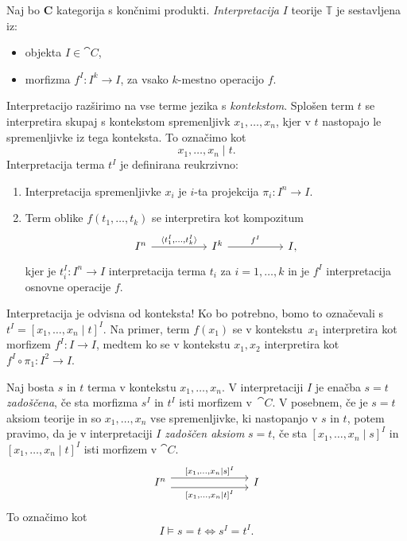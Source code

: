 \documentclass[../kategoricna_logika.tex]{subfiles}
\begin{document}
\begin{definicija}
  Naj bo $\mathbf{C}$ kategorija s končnimi
  produkti. \emph{Interpretacija} $I$ teorije $\mathbb{T}$ je
  sestavljena iz:
  \begin{itemize}
  \item objekta $I \in \cat{C}$,
  \item morfizma $f^I : I^k \to I$, za vsako $k$-mestno operacijo $f$.
  \end{itemize}
%
  Interpretacijo razširimo na vse terme jezika s \emph{kontekstom}.
  Splošen term $t$ se interpretira skupaj s
  kontekstom spremenljivk $x_1, \ldots, x_n$, kjer v $t$ nastopajo le
  spremenljivke iz tega konteksta. To označimo kot
$$x_1, \ldots, x_n \mid t.$$
%
Interpretacija terma $t^I$ je definirana reukrzivno:
  \begin{enumerate}
  \item Interpretacija spremenljivke $x_i$ je $i$-ta projekcija
    $\pi_i : I^n \to I.$
%
  \item Term oblike $f(t_1, \ldots, t_k)$ se interpretira kot
    kompozitum
    \begin{equation*}
      \begin{tikzcd}[column sep = 5em]
        I^n \ar[r, "{\langle t_1^I, \ldots, t_k^I\rangle}"] & I^k \ar[r, "f^I"] & I,
      \end{tikzcd}
    \end{equation*}
    kjer je $t_i^I : I^n \to I$ interpretacija terma $t_i$ za
    $i = 1, \ldots, k$ in je $f^I$ interpretacija osnovne operacije
    $f$.
  \end{enumerate}
\end{definicija}
%
\begin{opomba}
Interpretacija je odvisna od konteksta! Ko bo potrebno, bomo to označevali s
$t^I = [x_1, \ldots, x_n \mid t]^I$. Na primer, 
  term $f(x_1)$ se v kontekstu~$x_1$ interpretira kot morfizem
  $f^I : I \to I$, medtem ko se v kontekstu $x_1, x_2$ interpretira
  kot $f^I \circ \pi_1 : I^2 \to I$.
\end{opomba}
%
\begin{definicija}
  Naj bosta $s$ in $t$ terma v kontekstu $x_1, \ldots, x_n$.  V
  interpretaciji $I$ je enačba $s = t$ \emph{zadoščena}, če sta
  morfizma $s^I$ in $t^I$ isti morfizem v~$\cat{C}$.  V posebnem, če
  je $s = t$ aksiom teorije in so $x_1, \ldots, x_n$ vse
  spremenljivke, ki nastopanjo v $s$ in $t$, potem pravimo, da je v
  interpretaciji $I$ \emph{zadoščen aksiom} $s = t$, če sta
  $[x_1, \ldots, x_n \mid s]^I$ in $[x_1, \ldots, x_n \mid t]^I$ isti
  morfizem v $\cat{C}$.
  \begin{equation*}
    \begin{tikzcd}[column sep = 7em]
      I^n \ar[r, shift left=1ex, "{[x_1, \ldots, x_n \mid s]^I}"]
      \ar[r, shift right=1ex, "{[x_1, \ldots, x_n \mid t]^I}"'] & I
    \end{tikzcd}
  \end{equation*}
  To označimo kot
  \[I \models s = t \iff s^I = t^I.\]
\end{definicija}
\end{document}
